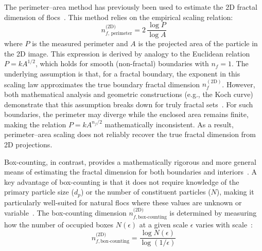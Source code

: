 \documentclass{agujournal2019}
\begin{document}
The perimeter--area method has previously been used to estimate the 2D fractal dimension of flocs~\cite{lee2004prediction, maggi2004method, tang2015reconstructing}. This method relies on the empirical scaling relation:
\begin{equation}
n_{f,\,\text{perimeter}}^{\text{(2D)}} = 2\,\frac{\log P}{\log A}
\end{equation}
where $P$ is the measured perimeter and $A$ is the projected area of the particle in the 2D image. This expression is derived by analogy to the Euclidean relation $P = k A^{1/2}$, which holds for smooth (non-fractal) boundaries with $n_f = 1$. The underlying assumption is that, for a fractal boundary, the exponent in this scaling law approximates the true boundary fractal dimension $n_f^{(2\mathrm{D})}$. However, both mathematical analysis and geometric constructions (e.g., the Koch curve) demonstrate that this assumption breaks down for truly fractal sets~\cite{cheng1995perimeter,frame_mandelbrot_neger_2025}. For such boundaries, the perimeter may diverge while the enclosed area remains finite, making the relation $P = k A^{n_f/2}$ mathematically inconsistent. As a result, perimeter–area scaling does not reliably recover the true fractal dimension from 2D projections.

Box-counting, in contrast, provides a mathematically rigorous and more general means of estimating the fractal dimension for both boundaries and interiors~\cite{foroutan1999advances}. A key advantage of box-counting is that it does not require knowledge of the primary particle size ($d_p$) or the number of constituent particles ($N$), making it particularly well-suited for natural flocs where these values are unknown or variable~\cite{bellouti1997flocs, spencer2022quantification}. The box-counting dimension $n_{f,\text{box-counting}}^{\text{(2D)}}$ is determined by measuring how the number of occupied boxes $N(\epsilon)$ at a given scale $\epsilon$ varies with scale~\cite{mandelbrot1967long}:
\begin{equation}
n_{f,\text{box-counting}}^{\text{(2D)}} = \frac{\log N(\epsilon)}{\log(1/\epsilon)}
\end{equation}
\end{document}
